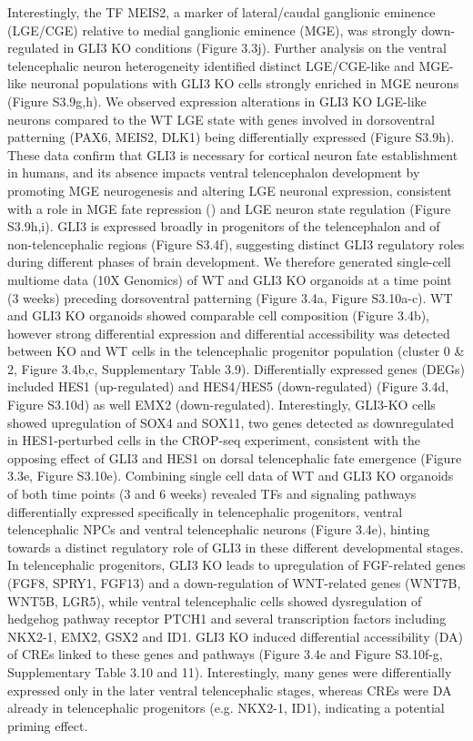 Interestingly, the TF MEIS2, a marker of lateral/caudal ganglionic eminence (LGE/CGE) relative to medial ganglionic eminence (MGE), was strongly down-regulated in GLI3 KO conditions (Figure 3.3j). Further analysis on the ventral telencephalic neuron heterogeneity identified distinct LGE/CGE-like and MGE-like neuronal populations with GLI3 KO cells strongly enriched in MGE neurons (Figure S3.9g,h). We observed expression alterations in GLI3 KO LGE-like neurons compared to the WT LGE state with genes involved in dorsoventral patterning (PAX6, MEIS2, DLK1) being differentially expressed (Figure S3.9h). These data confirm that GLI3 is necessary for cortical neuron fate establishment in humans, and its absence impacts ventral telencephalon development by promoting MGE neurogenesis and altering LGE neuronal expression, consistent with a role in MGE fate repression (\cite{sousa_sonic_2010}) and LGE neuron state regulation (Figure S3.9h,i).
GLI3 is expressed broadly in progenitors of the telencephalon and of non-telencephalic regions (Figure S3.4f), suggesting distinct GLI3 regulatory roles during different phases of brain development. We therefore generated single-cell multiome data (10X Genomics) of WT and GLI3 KO organoids at a time point (3 weeks) preceding dorsoventral patterning (Figure 3.4a, Figure S3.10a-c). WT and GLI3 KO organoids showed comparable cell composition (Figure 3.4b), however strong differential expression and differential accessibility was detected between KO and WT cells in the telencephalic progenitor population (cluster 0 \& 2, Figure 3.4b,c, Supplementary Table 3.9). Differentially expressed genes (DEGs) included HES1 (up-regulated) and HES4/HES5 (down-regulated) (Figure 3.4d, Figure S3.10d) as well EMX2 (down-regulated). Interestingly, GLI3-KO cells showed upregulation of SOX4 and SOX11, two genes detected as downregulated in HES1-perturbed cells in the CROP-seq experiment, consistent with the opposing effect of GLI3 and HES1 on dorsal telencephalic fate emergence (Figure 3.3e, Figure S3.10e).
Combining single cell data of WT and GLI3 KO organoids of both time points (3 and 6 weeks) revealed TFs and signaling pathways differentially expressed specifically in telencephalic progenitors, ventral telencephalic NPCs and ventral telencephalic neurons (Figure 3.4e), hinting towards a distinct regulatory role of GLI3 in these different developmental stages. In telencephalic progenitors, GLI3 KO leads to upregulation of FGF-related genes (FGF8, SPRY1, FGF13) and a down-regulation of WNT-related genes (WNT7B, WNT5B, LGR5), while ventral telencephalic cells showed dysregulation of hedgehog pathway receptor PTCH1 and several transcription factors including NKX2-1, EMX2, GSX2 and ID1. GLI3 KO induced differential accessibility (DA) of CREs linked to these genes and pathways (Figure 3.4e and Figure S3.10f-g, Supplementary Table 3.10 and 11). Interestingly, many genes were differentially expressed only in the later ventral telencephalic stages, whereas CREs were DA already in telencephalic progenitors (e.g. NKX2-1, ID1), indicating a potential priming effect.

